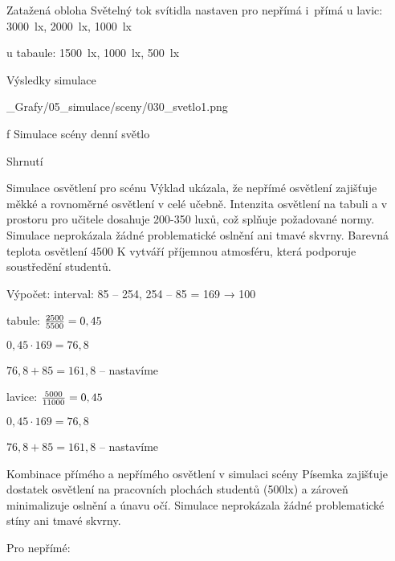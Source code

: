 \noindent Zatažená obloha
\noindent Světelný tok svítidla nastaven pro nepřímá i~přímá u lavic: 3000~lx, 2000~lx, 1000~lx

u tabaule: 1500~lx, 1000~lx, 500~lx

\secc Výsledky simulace

\medskip {}
\picw=18cm _Grafy/05_simulace/sceny/030_svetlo1.png
\caption/f Simulace scény denní světlo
\medskip




\secc Shrnutí


Simulace osvětlení pro scénu Výklad ukázala, že nepřímé osvětlení zajišťuje měkké
a rovnoměrné osvětlení v celé učebně. Intenzita osvětlení na tabuli a v prostoru pro učitele dosahuje 200-350 luxů,
což splňuje požadované normy. Simulace neprokázala žádné problematické oslnění ani tmavé skvrny. Barevná teplota
osvětlení 4500 K vytváří příjemnou atmosféru, která podporuje soustředění studentů.

Výpočet: interval: 85 – 254, 254 – 85 = 169 → 100 \pcent

tabule: ${2500 \over 5500} = 0,45$

        ${0,45 \cdot 169} = 76,8$

        $76,8 + 85 = 161,8$ – nastavíme

lavice: ${5000 \over 11000} = 0,45$

        ${0,45 \cdot 169} = 76,8$

        $76,8 + 85 = 161,8$ – nastavíme


Kombinace přímého a nepřímého osvětlení v simulaci scény Písemka zajišťuje dostatek osvětlení na pracovních plochách studentů
(500lx) a zároveň minimalizuje oslnění a únavu očí.
Simulace neprokázala žádné problematické stíny ani tmavé skvrny.

Pro nepřímé:


